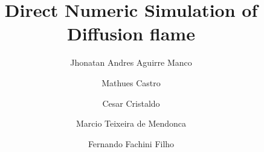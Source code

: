 \documentclass[preprint,12pt,authoryear]{elsarticle}
\begin{document}

\begin{frontmatter}



\title{Direct Numeric Simulation of Diffusion flame}



\author{Jhonatan Andres Aguirre Manco}

\author{Mathues Castro}
\author{Cesar Cristaldo}
\author{Marcio Teixeira de Mendonca}
\author{Fernando Fachini Filho}


%
\begin{abstract}
\end{abstract}


\end{frontmatter}
\end{document}

